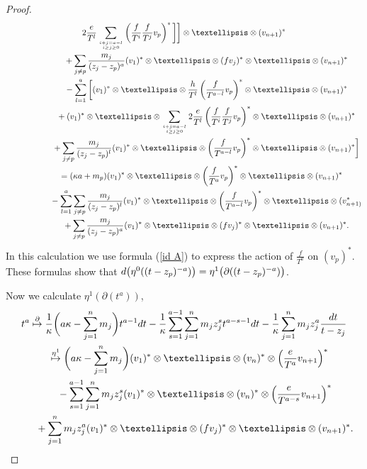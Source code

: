 \documentclass[11pt]{article}
\numberwithin{equation}{section}
\begin{document}
\begin{proof}
\begin{gather*}
2\frac{e}{T^l}\sum_{i+j=a-l \atop i\geq j\geq 0 } \left(\frac{f}{T^i}\frac{f}{T^j} v_p\right)^*\bigg] \bigg] \otimes\dots\otimes (v_{n+1})^* \nonumber \\
\hphantom{\frac1{(t-z_p)^{a}} \overset{\eta^0}\mapsto}{} + \sum_{j\neq p} \frac{m_j}{(z_j-z_p)^a} (v_1)^* \otimes\dots\otimes (fv_j)^* \otimes\dots\otimes (v_{n+1})^* \nonumber \\
\hphantom{\frac1{(t-z_p)^{a}} \overset{\eta^0}\mapsto}{}
 - \sum_{l=1}^a \bigg[ (v_1)^* \otimes\dots\otimes \frac{h}{T^l}\left(\frac{f}{T^{a-l}}v_p \right)^* \otimes\dots\otimes (v_{n+1})^* \nonumber \\
\hphantom{\frac1{(t-z_p)^{a}} \overset{\eta^0}\mapsto}{} + (v_1)^* \otimes\dots\otimes \sum_{i+j=a-l \atop i\geq j\geq 0} 2\frac{e}{T^l} \left(\frac{f}{T^i}\frac{f}{T^j}v_p\right)^*\otimes\dots\otimes (v_{n+1})^*
\nonumber \\
\hphantom{\frac1{(t-z_p)^{a}} \overset{\eta^0}\mapsto}{} + \sum_{j \neq p} \frac{m_j}{(z_j-z_p)^l} (v_1)^* \otimes\dots\otimes \left(\frac{f}{T^{a-l}} v_p \right)^* \otimes\dots\otimes (v_{n+1})^* \bigg] \nonumber \\
\hphantom{\frac1{(t-z_p)^{a}}}{} = (\kappa a + m_p) (v_1)^* \otimes\dots\otimes\left(\frac{f}{T^a}v_p \right)^* \otimes\dots\otimes (v_{n+1})^* \nonumber \\
\hphantom{\frac1{(t-z_p)^{a}} \overset{\eta^0}\mapsto}{} - \sum_{l=1}^a \sum_{j \neq p} \frac{m_j}{(z_j-z_p)^l} (v_1)^* \otimes\dots\otimes \left(\frac{f}{T^{a-l}} v_p \right)^* \otimes\dots\otimes
(v_{n+1)}^* \nonumber \\
\hphantom{\frac1{(t-z_p)^{a}} \overset{\eta^0}\mapsto}{} + \sum_{j\neq p} \frac{ m_j}{(z_j-z_p)^a} (v_1)^* \otimes\dots\otimes (fv_j)^* \otimes\dots\otimes (v_{n+1})^*.
\end{gather*}
In this calculation we use formula (\ref{id A}) to express the action of $\frac{f}{T^a}$ on $(v_{p})^*$. These formulas show that ${\rm d}\big(\eta^0((t-z_p)^{-a})\big) = \eta^1\big(\partial((t-z_p)^{-a})\big)$.

Now we calculate $\eta^1(\partial(t^a))$,
\begin{gather*}
t^a \overset{\partial}{\mapsto} \frac{1}{\kappa}\bigg(a\kappa - \sum_{j=1}^n m_j\bigg) t^{a-1} {\rm d}t - \frac{1}{\kappa} \sum_{s=1}^{a-1} \sum_{j=1}^n m_j z_j^s
t^{a-s-1} {\rm d}t - \frac{1}{\kappa} \sum_{j=1}^n m_j z_j^a \frac{{\rm d}t}{t-z_j} \nonumber \\
\hphantom{t^a}{} \overset{\eta^1}{\mapsto} \bigg(a\kappa - \sum_{j=1}^n m_j\bigg) (v_1)^* \otimes \dots \otimes (v_n)^* \otimes \left(\frac{e}{T^a} v_{n+1}\right)^*\nonumber \\
\hphantom{t^a \overset{\partial}{\mapsto}}{}- \sum_{s=1}^{a-1} \sum_{j=1}^n m_j z_j^s (v_1)^* \otimes \dots \otimes (v_n)^* \otimes \left(\frac{e}{T^{a-s}} v_{n+1}\right)^* \nonumber \\
\hphantom{t^a \overset{\partial}{\mapsto}}{} + \sum_{j=1}^n m_j z_j^a (v_1)^* \otimes \dots \otimes (f v_j)^* \otimes\dots\otimes (v_{n+1})^*.
\end{gather*}


\end{proof}
\end{document}
